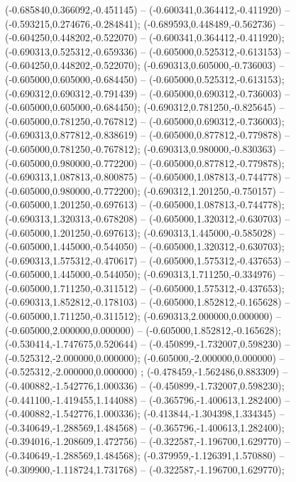  (-0.685840,0.366092,-0.451145) -- (-0.600341,0.364412,-0.411920) -- (-0.593215,0.274676,-0.284841);
 (-0.689593,0.448489,-0.562736) -- (-0.604250,0.448202,-0.522070) -- (-0.600341,0.364412,-0.411920);
 (-0.690313,0.525312,-0.659336) -- (-0.605000,0.525312,-0.613153) -- (-0.604250,0.448202,-0.522070);
 (-0.690313,0.605000,-0.736003) -- (-0.605000,0.605000,-0.684450) -- (-0.605000,0.525312,-0.613153);
 (-0.690312,0.690312,-0.791439) -- (-0.605000,0.690312,-0.736003) -- (-0.605000,0.605000,-0.684450);
 (-0.690312,0.781250,-0.825645) -- (-0.605000,0.781250,-0.767812) -- (-0.605000,0.690312,-0.736003);
 (-0.690313,0.877812,-0.838619) -- (-0.605000,0.877812,-0.779878) -- (-0.605000,0.781250,-0.767812);
 (-0.690313,0.980000,-0.830363) -- (-0.605000,0.980000,-0.772200) -- (-0.605000,0.877812,-0.779878);
 (-0.690313,1.087813,-0.800875) -- (-0.605000,1.087813,-0.744778) -- (-0.605000,0.980000,-0.772200);
 (-0.690312,1.201250,-0.750157) -- (-0.605000,1.201250,-0.697613) -- (-0.605000,1.087813,-0.744778);
 (-0.690313,1.320313,-0.678208) -- (-0.605000,1.320312,-0.630703) -- (-0.605000,1.201250,-0.697613);
 (-0.690313,1.445000,-0.585028) -- (-0.605000,1.445000,-0.544050) -- (-0.605000,1.320312,-0.630703);
 (-0.690313,1.575312,-0.470617) -- (-0.605000,1.575312,-0.437653) -- (-0.605000,1.445000,-0.544050);
 (-0.690313,1.711250,-0.334976) -- (-0.605000,1.711250,-0.311512) -- (-0.605000,1.575312,-0.437653);
 (-0.690313,1.852812,-0.178103) -- (-0.605000,1.852812,-0.165628) -- (-0.605000,1.711250,-0.311512);
 (-0.690313,2.000000,0.000000) -- (-0.605000,2.000000,0.000000) -- (-0.605000,1.852812,-0.165628);
 (-0.530414,-1.747675,0.520644) -- (-0.450899,-1.732007,0.598230) -- (-0.525312,-2.000000,0.000000);
 (-0.605000,-2.000000,0.000000) -- (-0.525312,-2.000000,0.000000) ;
 (-0.478459,-1.562486,0.883309) -- (-0.400882,-1.542776,1.000336) -- (-0.450899,-1.732007,0.598230);
 (-0.441100,-1.419455,1.144088) -- (-0.365796,-1.400613,1.282400) -- (-0.400882,-1.542776,1.000336);
 (-0.413844,-1.304398,1.334345) -- (-0.340649,-1.288569,1.484568) -- (-0.365796,-1.400613,1.282400);
 (-0.394016,-1.208609,1.472756) -- (-0.322587,-1.196700,1.629770) -- (-0.340649,-1.288569,1.484568);
 (-0.379959,-1.126391,1.570880) -- (-0.309900,-1.118724,1.731768) -- (-0.322587,-1.196700,1.629770);
